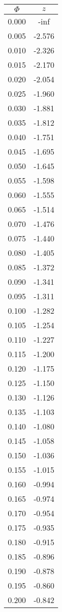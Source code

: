 \begin{tabular}{|c|c|}\hline
$\Phi$ & $z$ \\ \hline
0.000 & -inf\\
0.005 & -2.576\\
0.010 & -2.326\\
0.015 & -2.170\\
0.020 & -2.054\\
0.025 & -1.960\\
0.030 & -1.881\\
0.035 & -1.812\\
0.040 & -1.751\\
0.045 & -1.695\\
0.050 & -1.645\\
0.055 & -1.598\\
0.060 & -1.555\\
0.065 & -1.514\\
0.070 & -1.476\\
0.075 & -1.440\\
0.080 & -1.405\\
0.085 & -1.372\\
0.090 & -1.341\\
0.095 & -1.311\\
0.100 & -1.282\\
0.105 & -1.254\\
0.110 & -1.227\\
0.115 & -1.200\\
0.120 & -1.175\\
0.125 & -1.150\\
0.130 & -1.126\\
0.135 & -1.103\\
0.140 & -1.080\\
0.145 & -1.058\\
0.150 & -1.036\\
0.155 & -1.015\\
0.160 & -0.994\\
0.165 & -0.974\\
0.170 & -0.954\\
0.175 & -0.935\\
0.180 & -0.915\\
0.185 & -0.896\\
0.190 & -0.878\\
0.195 & -0.860\\
0.200 & -0.842\\
\hline \end{tabular}

\columnbreak

